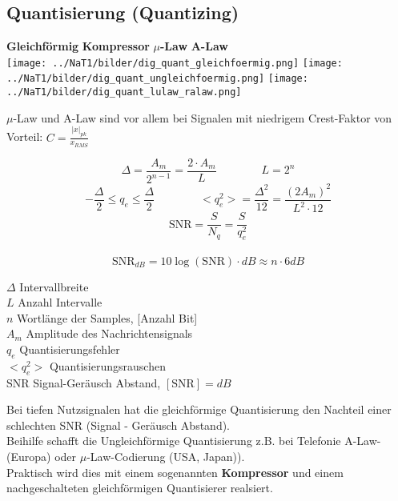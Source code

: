 \subsection{Quantisierung (Quantizing)}
	\begin{center}	
		\textbf{Gleichförmig} \hspace{3cm}
		\textbf{Kompressor} \hspace{2.9cm}
		\textbf{$\mu$-Law} \hspace{3cm}
		\textbf{A-Law}  \\
		\texttt{[image: ../NaT1/bilder/dig\_quant\_gleichfoermig.png]} \hspace{0.5cm}
		\texttt{[image: ../NaT1/bilder/dig\_quant\_ungleichfoermig.png]} \hspace{0.5cm}
		\texttt{[image: ../NaT1/bilder/dig\_quant\_lulaw\_ralaw.png]}	
	\end{center}
	$\mu$-Law und A-Law sind vor allem bei Signalen mit niedrigem Crest-Faktor von Vorteil: $C = \frac{|x|_{pk}}{x_{RMS}}$

\begin{minipage}{9cm}
	$$ \Delta = \frac{A_m}{2^{n-1}} = \frac{2 \cdot A_m}{L} \qquad \qquad L = 2^n$$ 
	$$ - \frac{\Delta}{2} \leq q_e \leq \frac{\Delta}{2} \qquad \qquad <q_e^2> = \frac{\Delta^2}{12} =
	\frac{(2 A_m)^2}{L^2 \cdot 12}$$ \vspace{0.1cm}
	$$ \text{SNR} =\frac{S}{N_q}= \frac{S}{q_e^2}$$\\
	$$\text{SNR}_{dB}=10 \log(\text{SNR}) \cdot dB \approx n \cdot 6dB$$
\end{minipage}
\begin{minipage}{9cm}
	$\Delta$ Intervallbreite \\
	$L$ Anzahl Intervalle \\
	$n$ Wortlänge der Samples, [Anzahl Bit] \\
	$A_m$ Amplitude des Nachrichtensignals \\
	$q_e$ Quantisierungsfehler \\
	$<q_e^2>$ Quantisierungsrauschen \\
	SNR Signal-Geräusch Abstand, $[\text{SNR}] = dB$
\end{minipage}


Bei tiefen Nutzsignalen hat die gleichförmige Quantisierung den Nachteil einer schlechten SNR
(Signal - Geräusch Abstand). \\
Beihilfe schafft die Ungleichförmige Quantisierung z.B. bei Telefonie
A-Law-(Europa) oder $\mu$-Law-Codierung (USA, Japan)). \\
Praktisch wird dies mit einem sogenannten \textbf{Kompressor} und einem nachgeschalteten
gleichförmigen Quantisierer realsiert.

